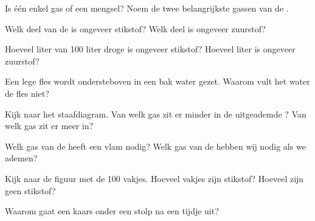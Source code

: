 \begin{exercise}[$\star$]\label{exo:g4:air-a-mixture-of-gases:1}
Is  één enkel gas of een mengsel? Noem de twee belangrijkste gassen
van de .
\end{exercise}

\begin{exercise}[$\star$]\label{exo:g4:air-a-mixture-of-gases:2}
Welk deel van de  is ongeveer stikstof? Welk deel is ongeveer
zuurstof?
\end{exercise}

\begin{exercise}[$\star$]\label{exo:g4:air-a-mixture-of-gases:3}
Hoeveel liter van 100 liter droge  is ongeveer stikstof? Hoeveel
liter is ongeveer zuurstof?
\end{exercise}

\begin{exercise}[$\star$]\label{exo:g4:air-a-mixture-of-gases:4}
Een lege fles wordt ondersteboven in een bak water gezet. Waarom vult het
water de fles niet?
\end{exercise}

\begin{exercise}[$\star$]\label{exo:g4:air-a-mixture-of-gases:5}
Kijk naar het staafdiagram. Van welk gas zit er minder in de uitgeademde
? Van welk gas zit er meer in?
\end{exercise}

\begin{exercise}[$\star$]\label{exo:g4:air-a-mixture-of-gases:6}
Welk gas van de  heeft een vlam nodig? Welk gas van de  hebben
wij nodig als we ademen?
\end{exercise}

\begin{exercise}[$\star$]\label{exo:g4:air-a-mixture-of-gases:7}
Kijk naar de figuur met de 100 vakjes. Hoeveel vakjes zijn stikstof?
Hoeveel zijn geen stikstof?
\end{exercise}

\begin{exercise}[$\star$]\label{exo:g4:air-a-mixture-of-gases:8}
Waarom gaat een kaars onder een stolp na een tijdje uit?
\end{exercise}

